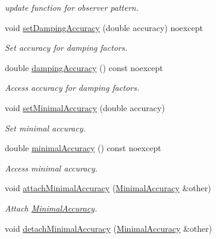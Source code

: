 \begin{DoxyCompactItemize}
\begin{DoxyCompactList}\small\item\em update function for observer pattern. \end{DoxyCompactList}\item 
void \hyperlink{classSpacy_1_1Mixin_1_1DampingAccuracy_af934aaf17595b7029d9a8ecec2561599_af934aaf17595b7029d9a8ecec2561599}{set\+Damping\+Accuracy} (double accuracy) noexcept
\begin{DoxyCompactList}\small\item\em Set accuracy for damping factors. \end{DoxyCompactList}\item 
double \hyperlink{classSpacy_1_1Mixin_1_1DampingAccuracy_a070c4c1b64c4392c6b21478bcf4c4a75_a070c4c1b64c4392c6b21478bcf4c4a75}{damping\+Accuracy} () const noexcept
\begin{DoxyCompactList}\small\item\em Access accuracy for damping factors. \end{DoxyCompactList}\item 
void \hyperlink{classSpacy_1_1Mixin_1_1MinimalAccuracy_a34d3d3320bba45d5c6c06b65e2cc808b_a34d3d3320bba45d5c6c06b65e2cc808b}{set\+Minimal\+Accuracy} (double accuracy)
\begin{DoxyCompactList}\small\item\em Set minimal accuracy. \end{DoxyCompactList}\item 
double \hyperlink{classSpacy_1_1Mixin_1_1MinimalAccuracy_ab9e4346b7070ce179593fc38d556705b_ab9e4346b7070ce179593fc38d556705b}{minimal\+Accuracy} () const noexcept
\begin{DoxyCompactList}\small\item\em Access minimal accuracy. \end{DoxyCompactList}\item 
void \hyperlink{classSpacy_1_1Mixin_1_1MinimalAccuracy_a0b2039bf970afdb0ede9999d6567f49b_a0b2039bf970afdb0ede9999d6567f49b}{attach\+Minimal\+Accuracy} (\hyperlink{classSpacy_1_1Mixin_1_1MinimalAccuracy_a9dc80f566f27efbd48c43c7f7c0961c2_a9dc80f566f27efbd48c43c7f7c0961c2}{Minimal\+Accuracy} \&other)
\begin{DoxyCompactList}\small\item\em Attach \hyperlink{classSpacy_1_1Mixin_1_1MinimalAccuracy}{Minimal\+Accuracy}. \end{DoxyCompactList}\item 
\hypertarget{classSpacy_1_1Mixin_1_1MinimalAccuracy_adb422b74482cdef5ffaff816da86b18d}{}void \hyperlink{classSpacy_1_1Mixin_1_1MinimalAccuracy_adb422b74482cdef5ffaff816da86b18d}{detach\+Minimal\+Accuracy} (\hyperlink{classSpacy_1_1Mixin_1_1MinimalAccuracy_a9dc80f566f27efbd48c43c7f7c0961c2_a9dc80f566f27efbd48c43c7f7c0961c2}{Minimal\+Accuracy} \&other)\label{classSpacy_1_1Mixin_1_1MinimalAccuracy_adb422b74482cdef5ffaff816da86b18d}


\end{DoxyCompactItemize}

